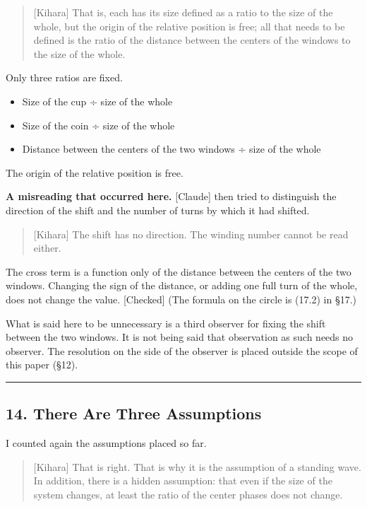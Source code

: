 \documentclass[
  a4paper,
]{article}
\providecommand{\tightlist}{%
  \setlength{\itemsep}{0pt}\setlength{\parskip}{0pt}}
\begin{document}
\begin{quote}
{[}Kihara{]} That is, each has its size defined as a ratio to the size
of the whole, but the origin of the relative position is free; all that
needs to be defined is the ratio of the distance between the centers of
the windows to the size of the whole.
\end{quote}

Only three ratios are fixed.

\begin{itemize}
\tightlist
\item
  Size of the cup ÷ size of the whole
\item
  Size of the coin ÷ size of the whole
\item
  Distance between the centers of the two windows ÷ size of the whole
\end{itemize}

The origin of the relative position is free.

\textbf{A misreading that occurred here.} {[}Claude{]} then tried to
distinguish the direction of the shift and the number of turns by which
it had shifted.

\begin{quote}
{[}Kihara{]} The shift has no direction. The winding number cannot be
read either.
\end{quote}

The cross term is a function only of the distance between the centers of
the two windows. Changing the sign of the distance, or adding one full
turn of the whole, does not change the value. {[}Checked{]} (The formula
on the circle is (17.2) in §17.)

What is said here to be unnecessary is a third observer for fixing the
shift between the two windows. It is not being said that observation as
such needs no observer. The resolution on the side of the observer is
placed outside the scope of this paper (§12).

\begin{center}\rule{0.5\linewidth}{0.5pt}\end{center}

\subsection{14. There Are Three
Assumptions}\label{there-are-three-assumptions}

I counted again the assumptions placed so far.

\begin{quote}
{[}Kihara{]} That is right. That is why it is the assumption of a
standing wave. In addition, there is a hidden assumption: that even if
the size of the system changes, at least the ratio of the center phases
does not change.
\end{quote}
\end{document}
